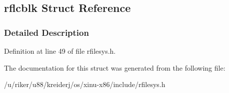 \hypertarget{structrflcblk}{}\subsection{rflcblk Struct Reference}
\label{structrflcblk}


\subsubsection{Detailed Description}


Definition at line 49 of file rfilesys.\+h.



The documentation for this struct was generated from the following file\+:\begin{DoxyCompactItemize}
\item 
/u/riker/u88/kreiderj/os/xinu-\/x86/include/rfilesys.\+h\end{DoxyCompactItemize}
